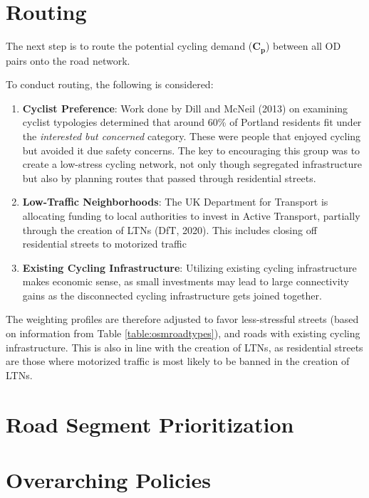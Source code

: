 \documentclass[]{elsarticle} %
\providecommand{\tightlist}{%
  \setlength{\itemsep}{0pt}\setlength{\parskip}{0pt}}
\begin{document}
\hypertarget{routing}{%
\section{Routing}\label{routing}}

The next step is to route the potential cycling demand
(\(\boldsymbol{C_{p}}\)) between all OD pairs onto the road network.

To conduct routing, the following is considered:

\begin{enumerate}
\def\labelenumi{\arabic{enumi}.}
\tightlist
\item
  \textbf{Cyclist Preference}: Work done by Dill and McNeil (2013) on
  examining cyclist typologies determined that around 60\% of Portland
  residents fit under the \emph{interested but concerned} category.
  These were people that enjoyed cycling but avoided it due safety
  concerns. The key to encouraging this group was to create a low-stress
  cycling network, not only though segregated infrastructure but also by
  planning routes that passed through residential streets.
\item
  \textbf{Low-Traffic Neighborhoods}: The UK Department for Transport is
  allocating funding to local authorities to invest in Active Transport,
  partially through the creation of LTNs (DfT, 2020). This includes
  closing off residential streets to motorized traffic
\item
  \textbf{Existing Cycling Infrastructure}: Utilizing existing cycling
  infrastructure makes economic sense, as small investments may lead to
  large connectivity gains as the disconnected cycling infrastructure
  gets joined together.
\end{enumerate}

The weighting profiles are therefore adjusted to favor less-stressful
streets (based on information from Table \ref{table:osmroadtypes}), and
roads with existing cycling infrastructure. This is also in line with
the creation of LTNs, as residential streets are those where motorized
traffic is most likely to be banned in the creation of LTNs.

\hypertarget{road-segment-prioritization}{%
\section{Road Segment
Prioritization}\label{road-segment-prioritization}}

\hypertarget{overarching-policies}{%
\section{Overarching Policies}\label{overarching-policies}}
\end{document}
